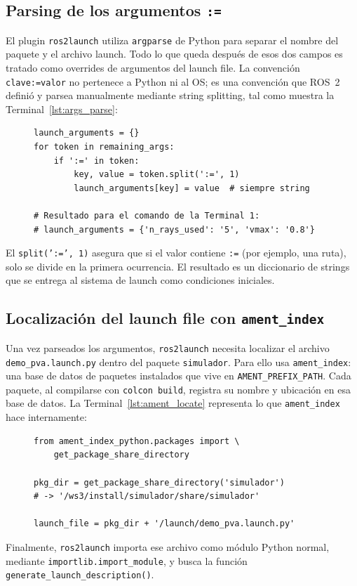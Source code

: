 \subsection{Parsing de los argumentos \texttt{:=}}

El plugin \texttt{ros2launch} utiliza \texttt{argparse} de Python para separar el nombre del paquete y el archivo launch. Todo lo que queda después de esos dos campos es tratado como overrides de argumentos del launch file. La convención \texttt{clave:=valor} no pertenece a Python ni al OS; es una convención que ROS~2 definió y parsea manualmente mediante string splitting, tal como muestra la Terminal~\ref{lst:args_parse}:

\begin{figure}[H]
\centering
\begin{lstlisting}[style=python, caption={Parsing de overrides de argumentos (simplificación del mecanismo interno).}, label={lst:args_parse}]
launch_arguments = {}
for token in remaining_args:
    if ':=' in token:
        key, value = token.split(':=', 1)
        launch_arguments[key] = value  # siempre string

# Resultado para el comando de la Terminal 1:
# launch_arguments = {'n_rays_used': '5', 'vmax': '0.8'}
\end{lstlisting}
\end{figure}

El \texttt{split(':=', 1)} asegura que si el valor contiene \texttt{:=} (por ejemplo, una ruta), solo se divide en la primera ocurrencia. El resultado es un diccionario de strings que se entrega al sistema de launch como condiciones iniciales.

\subsection{Localización del launch file con \texttt{ament\_index}}

Una vez parseados los argumentos, \texttt{ros2launch} necesita localizar el archivo \texttt{demo\_pva.launch.py} dentro del paquete \texttt{simulador}. Para ello usa \texttt{ament\_index}: una base de datos de paquetes instalados que vive en \texttt{AMENT\_PREFIX\_PATH}. Cada paquete, al compilarse con \texttt{colcon build}, registra su nombre y ubicación en esa base de datos. La Terminal~\ref{lst:ament_locate} representa lo que \texttt{ament\_index} hace internamente:

\begin{figure}[H]
\centering
\begin{lstlisting}[style=python, caption={Localización del launch file (simplificado).}, label={lst:ament_locate}]
from ament_index_python.packages import \
    get_package_share_directory

pkg_dir = get_package_share_directory('simulador')
# -> '/ws3/install/simulador/share/simulador'

launch_file = pkg_dir + '/launch/demo_pva.launch.py'
\end{lstlisting}
\end{figure}

Finalmente, \texttt{ros2launch} importa ese archivo como módulo Python normal, mediante \texttt{importlib.import\_module}, y busca la función \texttt{generate\_launch\_description()}.
